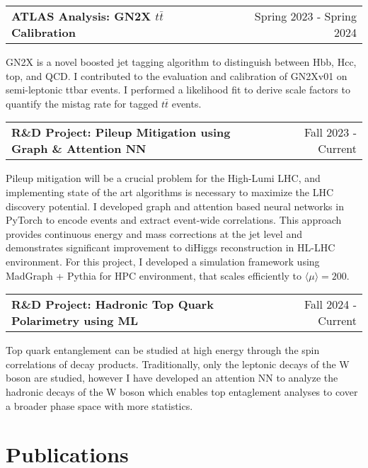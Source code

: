 \documentclass[a4paper,12pt]{article}
\makeatletter
\newenvironment{jobshort}[2]
    {
    \begin{tabularx}{\linewidth}{@{}l X r@{}}
    \textbf{#1} & \hfill &  #2 \\[3.75pt]
    \end{tabularx}
    }
    {
    }
\makeatother
\begin{document}
\begin{jobshort}{ATLAS Analysis: GN2X $t\bar{t}$ Calibration}{Spring 2023 - Spring 2024}
GN2X is a novel boosted jet tagging algorithm to distinguish between Hbb, Hcc, top, and QCD.
I contributed to the evaluation and calibration of GN2Xv01 on semi-leptonic ttbar events.
I performed a likelihood fit to derive scale factors to quantify the mistag rate for tagged $t\bar{t}$ events.
\end{jobshort}

\begin{jobshort}{R\&D Project: Pileup Mitigation using Graph \& Attention NN}{Fall 2023 - Current}
Pileup mitigation will be a crucial problem for the High-Lumi LHC, and implementing state of the art algorithms is necessary to maximize the LHC discovery potential.
I developed graph and attention based neural networks in PyTorch to encode events and extract event-wide correlations.
This approach provides continuous energy and mass corrections at the jet level and demonstrates significant improvement to diHiggs reconstruction in HL-LHC environment\cite{PU}.
For this project, I developed a simulation framework using MadGraph + Pythia for HPC environment, that scales efficiently to $\langle \mu \rangle=200$.
\end{jobshort}

\begin{jobshort}{R\&D Project: Hadronic Top Quark Polarimetry using ML}{Fall 2024 - Current}
Top quark entanglement can be studied at high energy through the spin correlations of decay products.
Traditionally, only the leptonic decays of the W boson are studied, however I have developed an attention NN to analyze the hadronic decays of the W boson which enables top entaglement analyses to cover a broader phase space with more statistics.
\end{jobshort}

\section{Publications}
\begin{refsection}
\nocite{*}
\printbibliography[heading=none]
\end{refsection}

\end{document}
